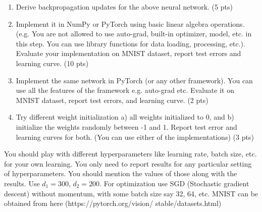 \documentclass[a4paper]{article}
\theoremstyle{definition}
\begin{document}
\begin{enumerate}
    \item Derive backpropagation updates for the above neural network. (5 pts)
    \item Implement it in NumPy or PyTorch using basic linear algebra operations. (e.g. You are not allowed to use auto-grad, built-in optimizer, model, etc. in this step. You can use library functions for data loading, processing, etc.). Evaluate your implementation on MNIST dataset, report test errors and learning curve. (10 pts)
    \item Implement the same network in PyTorch (or any other framework). You can use all the features of the framework e.g. auto-grad etc. Evaluate it on MNIST dataset, report test errors, and learning curve. (2 pts)
    \item Try different weight initialization a) all weights initialized to 0, and b) initialize the weights randomly between -1 and 1. Report test error and learning curves for both. (You can use either of the implementations) (3 pts)
\end{enumerate}

You should play with different hyperparameters like learning rate, batch size, etc. for your own learning. You only need to report results for any particular setting of hyperparameters. You should mention the values of those along with the results. Use $d_1 = 300$, $d_2 = 200$. For optimization use SGD (Stochastic gradient descent) without momentum, with some batch size say 32, 64, etc. MNIST can be obtained from here (https://pytorch.org/vision/ stable/datasets.html)


\end{document}
